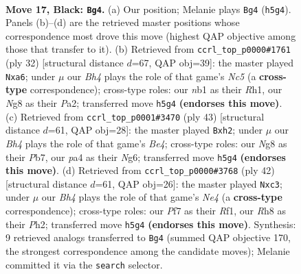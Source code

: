 \documentclass[11pt]{article}
\begin{document}
\clearpage

\begin{figure}[p]\centering
\begin{subfigure}{0.46\textwidth}\centering
\resizebox{\linewidth}{!}{%
\newchessgame
\chessboard[
  setfen={r3k1nr/5ppp/p1n5/4P2b/P6P/1P3N2/4BKP1/RN5R b kq - 0 17},
  showmover=false,
  pgfstyle=straightmove, color=movearrow, markmove={h5-g4}
]}
\caption{}
\end{subfigure}\hfill
\begin{subfigure}{0.46\textwidth}\centering
\resizebox{\linewidth}{!}{%
\newchessgame
\chessboard[
  setfen={r2r4/pppb2kp/n5p1/2N1p3/2P5/8/PP2BPPP/R3K2R w KQ - 2 17},
  showmover=false,
  pgfstyle=straightmove, color=movearrow, markmove={c5-a6}
]}
\caption{}
\end{subfigure}
\\[4pt]
\begin{subfigure}{0.46\textwidth}\centering
\resizebox{\linewidth}{!}{%
\newchessgame
\chessboard[
  setfen={2r3k1/pp4pp/4p1n1/2p1b3/4P3/2PPB3/PP2KN1R/R7 b - - 0 22},
  showmover=false,
  pgfstyle=straightmove, color=movearrow, markmove={e5-h2}
]}
\caption{}
\end{subfigure}\hfill
\begin{subfigure}{0.46\textwidth}\centering
\resizebox{\linewidth}{!}{%
\newchessgame
\chessboard[
  setfen={r6r/p2n2pp/2p2nk1/8/P3N3/2p1BP2/6PP/R3KR2 w Q - 1 22},
  showmover=false,
  pgfstyle=straightmove, color=movearrow, markmove={e4-c3}
]}
\caption{}
\end{subfigure}
\caption{\textbf{Move 17, Black: \texttt{Bg4}.} (a) Our position; Melanie plays \texttt{Bg4} (\texttt{h5g4}). Panels (b)--(d) are the retrieved master positions whose correspondence most drove this move (highest QAP objective among those that transfer to it). (b) Retrieved from \texttt{ccrl\_top\_p0000\#1761} (ply 32) [structural distance $d$=67, QAP obj=39]: the master played \texttt{Nxa6}; under $\mu$ our \emph{Bh4} plays the role of that game's \emph{Nc5} (a \textbf{cross-type} correspondence); cross-type roles: our \emph{n}b1 as their \emph{R}h1, our \emph{N}g8 as their \emph{P}a2; transferred move \texttt{h5g4} \textbf{(endorses this move)}. (c) Retrieved from \texttt{ccrl\_top\_p0001\#3470} (ply 43) [structural distance $d$=61, QAP obj=28]: the master played \texttt{Bxh2}; under $\mu$ our \emph{Bh4} plays the role of that game's \emph{Be4}; cross-type roles: our \emph{N}g8 as their \emph{P}b7, our \emph{p}a4 as their \emph{N}g6; transferred move \texttt{h5g4} \textbf{(endorses this move)}. (d) Retrieved from \texttt{ccrl\_top\_p0000\#3768} (ply 42) [structural distance $d$=61, QAP obj=26]: the master played \texttt{Nxc3}; under $\mu$ our \emph{Bh4} plays the role of that game's \emph{Ne4} (a \textbf{cross-type} correspondence); cross-type roles: our \emph{P}f7 as their \emph{R}f1, our \emph{R}h8 as their \emph{P}h2; transferred move \texttt{h5g4} \textbf{(endorses this move)}. Synthesis: 9 retrieved analogs transferred to \texttt{Bg4} (summed QAP objective 170, the strongest correspondence among the candidate moves); Melanie committed it via the \texttt{search} selector.}
\label{fig:thought-m33}
\end{figure}
\end{document}

